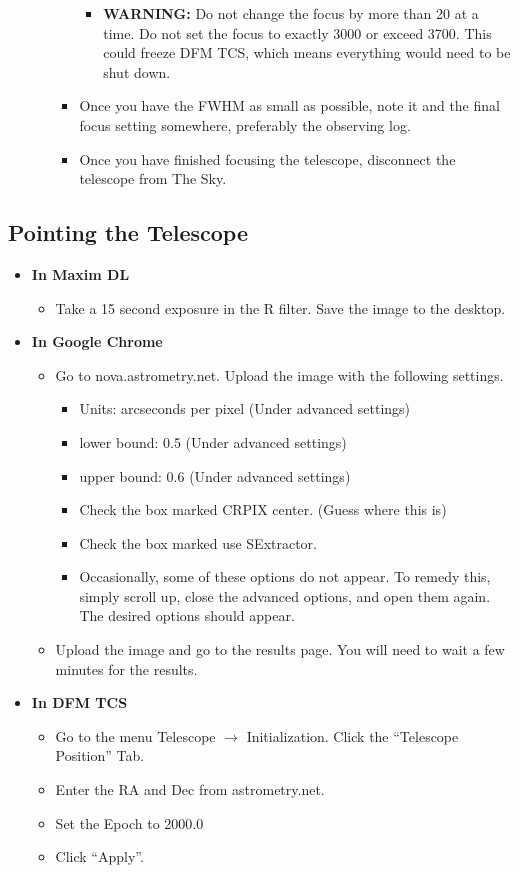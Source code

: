 \documentclass[letterpaper, 12pt]{report}
\begin{document}
\begin{itemize}
\begin{itemize}
\begin{itemize}
			\begin{itemize}
				\item \large \textbf{WARNING:} Do not change the focus by more than 20 at a time. Do not set the focus to exactly 3000 or exceed 3700. This could freeze DFM TCS, which means everything would need to be shut down.
			\end{itemize}
			\item Once you have the FWHM as small as possible, note it and the final focus setting somewhere, preferably the observing log.
			\item Once you have finished focusing the telescope, disconnect the telescope from The Sky.
		\end{itemize}
	\end{itemize}
\end{itemize}
\subsection{Pointing the Telescope}
\begin{itemize}
	\item \large \textbf{In Maxim DL}
	\begin{itemize}
		\item Take a 15 second exposure in the R filter. Save the image to the desktop.
	\end{itemize}
	\item \large \textbf{In Google Chrome}
	\begin{itemize}
		\item Go to nova.astrometry.net. Upload the image with the following settings.
		\begin{itemize}
			\item Units: arcseconds per pixel (Under advanced settings)
			\item lower bound: 0.5 (Under advanced settings)
			\item upper bound: 0.6 (Under advanced settings)
			\item Check the box marked CRPIX center. (Guess where this is)
			\item Check the box marked use SExtractor.
			\item Occasionally, some of these options do not appear. To remedy this, simply scroll up, close the advanced options, and open them again. The desired options should appear.
		\end{itemize}
		\item Upload the image and go to the results page. You will need to wait a few minutes for the results.
	\end{itemize}
	\newpage
	\item \large \textbf{In DFM TCS}
	\begin{itemize}
		\item Go to the menu Telescope $\rightarrow$ Initialization. Click the ``Telescope Position'' Tab.
		\item Enter the RA and Dec from astrometry.net.
		\item Set the Epoch to 2000.0
		\item Click ``Apply''.
	\end{itemize}
\end{itemize}
\end{document}
